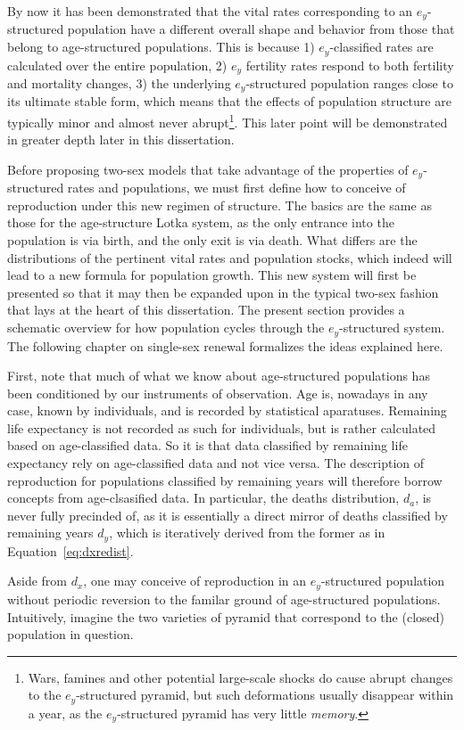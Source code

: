  \FloatBarrier
\label{sec:exstructuredrenewal}
By now it has been demonstrated that the vital rates corresponding to an
$e_y$-structured population have a different overall shape and behavior from
those that belong to age-structured populations. This is because 1) $e_y$-classified rates
are calculated over the entire population, 2) $e_y$ fertility rates respond to
both fertility and mortality changes, 3) the underlying $e_y$-structured
population ranges close to its ultimate stable form, which means that
the effects of population structure are typically minor and almost never
abrupt\footnote{Wars, famines and other potential large-scale shocks do cause
abrupt changes to the $e_y$-structured pyramid, but such deformations usually
disappear within a year, as the  $e_y$-structured pyramid has very little
\textit{memory}.}. This later point will be demonstrated in greater depth later
in this dissertation.

Before proposing two-sex models that take advantage of the properties of
$e_y$-structured rates and populations, we must first define how to conceive of
reproduction under this new regimen of structure. The basics are the
same as those for the age-structure Lotka system, as the only entrance into the
population is via birth, and the only exit is via death. What differs are the
distributions of the pertinent vital rates and population stocks, which indeed
will lead to a new formula for population growth. This new system will first be
presented so that it may then be expanded upon in the typical two-sex fashion
that lays at the heart of this dissertation. The present section provides a
schematic overview for how population cycles through the
$e_y$-structured system. The following chapter on single-sex renewal formalizes
the ideas explained here.

First, note that much of what we know about age-structured populations has been
conditioned by our instruments of observation. Age is, nowadays in any case,
known by individuals, and is recorded by statistical aparatuses. Remaining life
expectancy is not recorded as such for individuals, but is rather calculated
based on age-classified data. So it is that data classified by remaining
life expectancy rely on age-classified data and not vice versa. The description of 
reproduction for populations classified by remaining years will therefore
 borrow concepts from age-clsasified data. In particular, the deaths
distribution, $d_a$, is never fully precinded of, as it is essentially a direct
mirror of deaths classified by remaining years $d_y$, which is
iteratively derived from the former as in Equation~\eqref{eq:dxredist}.

Aside from $d_x$, one may conceive of reproduction in an $e_y$-structured
population without periodic reversion to the familar ground of age-structured populations.
Intuitively, imagine the two varieties of pyramid that correspond to the
(closed) population in question. 